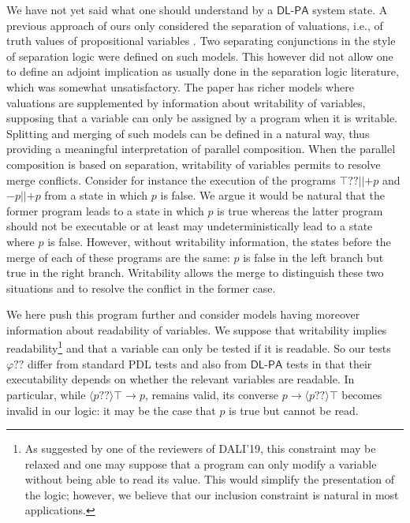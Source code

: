 \documentclass{llncs}
\newcommand{\pll}{ {||} }							%
\newcommand{\testendo}{?\!\!?}			%
\newcommand{\Dlpa}{\ensuremath{\mathsf{DL\text{-}PA}}\xspace}
\newcommand{\assgntopV}[1]{{\mathtt {+} #1}}
\newcommand{\assgnbotV}[1]{{\mathtt {-} #1}}
\newcommand{\ldia}[1]{ \big\langle #1 \big\rangle}
\newcommand{\limp}{ \rightarrow }
\renewcommand{\phi}{\varphi}
\begin{document}
We have not yet said what one should understand by a \Dlpa system state. 
A previous approach of ours only considered the separation of valuations, i.e., 
of truth values of propositional variables \cite{Herzig-Wollic13}. 
Two separating conjunctions in the style of separation logic were defined on such models. 
This however did not allow one to define an adjoint implication as usually done in the separation logic literature, which was somewhat unsatisfactory.
The paper \cite{HerzigEtal-Ijcai19} has richer models where valuations are supplemented by information about writability of variables, 
supposing that a variable can only be assigned by a program when it is writable. 
Splitting and merging of such models can be defined in a natural way, thus providing a meaningful interpretation of parallel composition. 
When the parallel composition is based on separation, writability of variables permits to resolve merge conflicts.
Consider for instance the execution of the programs $\top \testendo \pll \assgntopV p$ and $\assgnbotV p \pll \assgntopV p$ from a state in which $p$ is false.
We argue it would be natural that the former program leads to a state in which $p$ is true
whereas the latter program should not be executable or at least may undeterministically lead to a state where $p$ is false.
However, without writability information, the states before the merge of each of these programs are the same:
$p$ is false in the left branch but true in the right branch.
Writability allows the merge to distinguish these two situations and to resolve the conflict in the former case.

We here push this program further and consider models having moreover information about readability of variables. 
We suppose that writability implies readability\footnote{%
As suggested by one of the reviewers of DALI'19, this constraint may be relaxed 
and one may suppose that a program can only modify a variable without being able to read its value. 
This would simplify the presentation of the logic; however, we believe that our inclusion constraint is natural in most applications.
}
and that a variable can only be tested if it is readable. 
So our tests $\phi \testendo$ differ from standard PDL tests and also from \Dlpa tests in that their 
executability depends on whether the relevant variables are readable. In particular, while 
$\ldia{ p \testendo } \top \limp p$, remains valid, its converse
$p \limp \ldia{ p \testendo } \top $ becomes invalid in our logic: 
it may be the case that $p$ is true but cannot be read.
\end{document}
